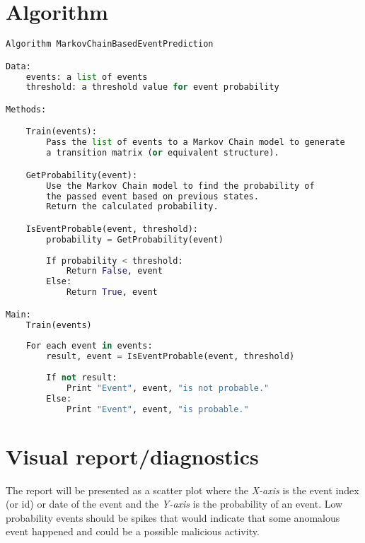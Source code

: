 \documentclass{VUMIFPSmagistrinis}
\begin{document}
\section{Algorithm}
    \begin{lstlisting}[language=Python]
Algorithm MarkovChainBasedEventPrediction

Data:
    events: a list of events
    threshold: a threshold value for event probability

Methods:

    Train(events):
        Pass the list of events to a Markov Chain model to generate 
        a transition matrix (or equivalent structure).

    GetProbability(event):
        Use the Markov Chain model to find the probability of 
        the passed event based on previous states.
        Return the calculated probability.

    IsEventProbable(event, threshold):
        probability = GetProbability(event)
        
        If probability < threshold:
            Return False, event
        Else:
            Return True, event

Main:
    Train(events)
    
    For each event in events:
        result, event = IsEventProbable(event, threshold)
        
        If not result:
            Print "Event", event, "is not probable."
        Else:
            Print "Event", event, "is probable."

\end{lstlisting}


\section{Visual report/diagnostics}
    The report will be presented as a scatter plot where the \textit{X-axis} is the event index (or id) or date of the event and the \textit{Y-axis} is the probability of an event.
    Low probability events should be spikes that would indicate that some anomalous event happened and could be a possible malicious activity.

		
\pagebreak
\printbibliography[heading=bibintoc] 
\end{document}
